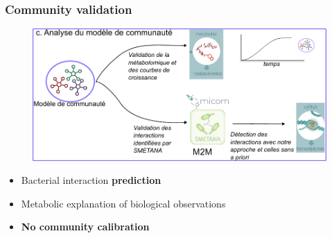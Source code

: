 \documentclass[8pt,usenames,dvipsnames]{beamer}
\begin{document}
\begin{frame}
\frametitle{Community validation}

\begin{figure}
\includegraphics[width=\textwidth]{figures/com-validation.pdf}
\end{figure}
\begin{block}{}
\begin{itemize}
\item Bacterial interaction \textbf{prediction}
\item Metabolic explanation of biological observations
\item \textbf{No community calibration}
\end{itemize}
\end{block}
\end{frame}
\end{document}

